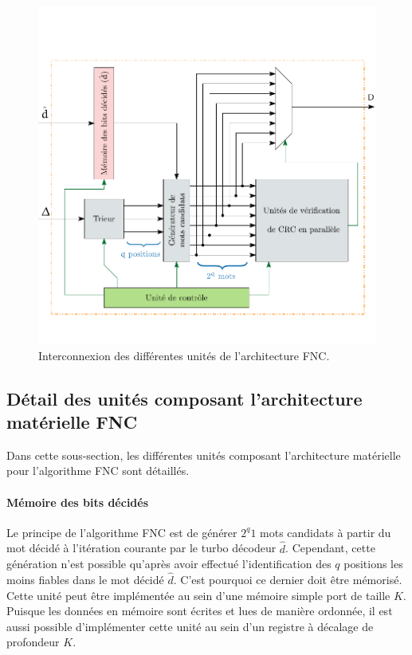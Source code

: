 \begin{figure}[!t]
	\centering
	\includegraphics{main/ch4_fig/ipe/fnc_arch.pdf}
	\caption{Interconnexion des différentes unités de l'architecture FNC. \label{fig:fnc_arch}}
\end{figure}

\subsection{Détail des unités composant l'architecture matérielle FNC}
Dans cette sous-section, les différentes unités composant l'architecture matérielle pour l'algorithme FNC sont détaillés.

\paragraph*{Mémoire des bits décidés} Le principe de l'algorithme FNC est de générer $2^q1$ mots candidats à partir 
du mot décidé à l'itération courante par le turbo décodeur $\hat{d}$. Cependant, cette génération n'est possible 
qu'après avoir effectué l'identification des $q$ positions les moins fiables dans le mot décidé $\hat{d}$. C'est pourquoi ce dernier doit 
être mémorisé. Cette unité peut être implémentée au sein d'une mémoire simple port de taille $K$. Puisque les données en 
mémoire sont écrites et lues de manière ordonnée, il est aussi possible d'implémenter cette unité au sein d'un registre à décalage 
de profondeur $K$.

